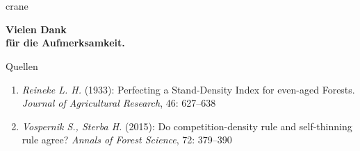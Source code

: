 \section*{}

\begin{frame}[plain]
  \begin{center}

    \begin{minipage}{0.75\textwidth}
      \begin{beamercolorbox}{crane}
        \begin{center}
          \vspace{1em}
          \textbf{\huge Vielen Dank}
          \\
          \textbf{\small für die Aufmerksamkeit.}
          \\
        \end{center}
      \end{beamercolorbox}
    \end{minipage}

    \hspace{0.017\textwidth}  %
    \begin{minipage}{0.725\textwidth}
      \begin{block}{Quellen}
        \begin{tiny}
          \begin{enumerate}
          \item \emph{Reineke L. H.} (1933): Perfecting a Stand-Density Index for even-aged Forests. \emph{Journal of Agricultural Research}, 46: 627--638
          \item \emph{Vospernik S., Sterba H.} (2015): Do competition-density rule and self-thinning rule agree? \emph{Annals of Forest Science}, 72: 379--390
          \end{enumerate}
        \end{tiny}
      \end{block}
    \end{minipage}
  \end{center}
\end{frame}

